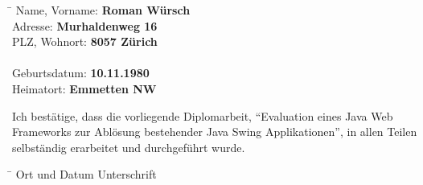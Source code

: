 \begin{tabbing}
  \hspace*{6cm}\= \kill
  Name, Vorname: \> {\bf Roman Würsch} \\
  Adresse: \> {\bf Murhaldenweg 16} \\
  PLZ, Wohnort: \> {\bf 8057 Zürich} \\
  \\
  Geburtsdatum: \> {\bf 10.11.1980} \\
  Heimatort: \> {\bf Emmetten NW} \\
\end{tabbing}

\noindent
Ich bestätige, dass die vorliegende Diplomarbeit, ``Evaluation eines Java Web
Frameworks zur Ablösung bestehender Java Swing Applikationen'', in allen Teilen
selbständig erarbeitet und durchgeführt wurde.

\vspace*{3cm}

\begin{tabbing}
  \hspace*{8cm}\= \kill
  Ort und Datum \> {Unterschrift} \\
\end{tabbing}